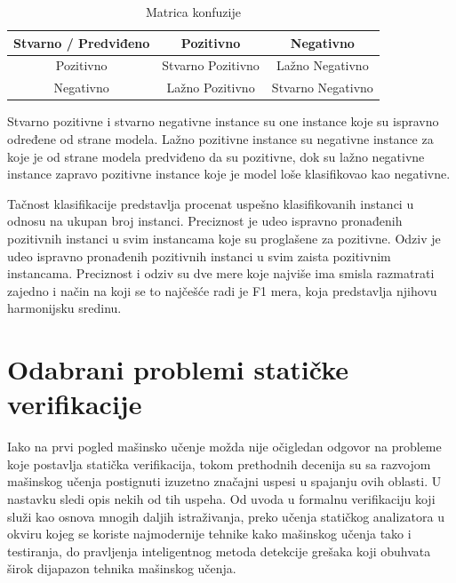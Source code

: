 \documentclass[a4paper]{article}
\theoremstyle{definition}
\begin{document}
{\begin{table}[h]
	\centering
	\begin{tabular}{ |c|cc| } 
		\hline
		Stvarno / Predviđeno & Pozitivno & Negativno \\ 
		\hline
		Pozitivno & Stvarno Pozitivno & Lažno Negativno \\ 
		Negativno & Lažno Pozitivno & Stvarno Negativno \\ 
		\hline
	\end{tabular}
	\caption{Matrica konfuzije}
	\label{table:matrica_konfuzije}
\end{table}

\par Stvarno pozitivne i stvarno negativne instance su one instance koje su ispravno određene od strane modela. Lažno pozitivne instance su negativne instance za koje je od strane modela predviđeno da su pozitivne, dok su lažno negativne instance zapravo pozitivne instance koje je model loše klasifikovao kao negativne. 

\par Tačnost klasifikacije predstavlja procenat uspešno klasifikovanih instanci u odnosu na ukupan broj instanci. Preciznost je udeo ispravno pronađenih pozitivnih instanci u svim instancama koje su proglašene za pozitivne. Odziv je udeo ispravno pronađenih pozitivnih instanci u svim zaista pozitivnim instancama. Preciznost i odziv su dve mere koje najviše ima smisla razmatrati zajedno i način na koji se to najčešće radi je F1 mera, koja predstavlja njihovu harmonijsku sredinu.

\section{Odabrani problemi statičke verifikacije}
\label{sec:naslovN}

\par Iako na prvi pogled mašinsko učenje možda nije očigledan odgovor na probleme koje postavlja statička verifikacija, tokom prethodnih decenija su sa razvojom mašinskog učenja postignuti izuzetno značajni uspesi u spajanju ovih oblasti. U nastavku sledi opis nekih od tih uspeha. Od uvoda u formalnu verifikaciju koji služi kao osnova mnogih daljih istraživanja, preko učenja statičkog analizatora u okviru kojeg se koriste najmodernije tehnike kako mašinskog učenja tako i testiranja, do pravljenja inteligentnog metoda detekcije grešaka koji obuhvata širok dijapazon tehnika mašinskog učenja.


}
\end{document}
